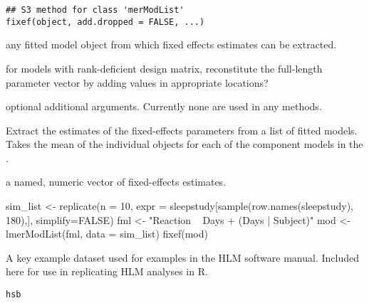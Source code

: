 \documentclass[letterpaper]{book}
\begin{document}
%
\begin{Usage}
\begin{verbatim}
## S3 method for class 'merModList'
fixef(object, add.dropped = FALSE, ...)
\end{verbatim}
\end{Usage}
%
\begin{Arguments}
\begin{ldescription}
\item[\code{object}] any fitted model object from which fixed
effects estimates can be extracted.

\item[\code{add.dropped}] for models with rank-deficient design
matrix, reconstitute the full-length parameter vector by
adding  values in appropriate locations?

\item[\code{...}] optional additional arguments. Currently
none are used in any methods.
\end{ldescription}
\end{Arguments}
%
\begin{Details}\relax
Extract the estimates of the fixed-effects parameters from a list of
fitted  models. Takes the mean of the individual 
objects for each of the component models in the .
\end{Details}
%
\begin{Value}
a named, numeric vector of fixed-effects estimates.
\end{Value}
%
\begin{Examples}
\begin{ExampleCode}
sim_list <- replicate(n = 10,
        expr = sleepstudy[sample(row.names(sleepstudy), 180),],
        simplify=FALSE)
fml <- "Reaction ~ Days + (Days | Subject)"
mod <- lmerModList(fml, data = sim_list)
fixef(mod)
\end{ExampleCode}
\end{Examples}
%
\begin{Description}\relax
A key example dataset used for examples in the HLM software manual.
Included here for use in replicating HLM analyses in R.
\end{Description}
%
\begin{Usage}
\begin{verbatim}
hsb
\end{verbatim}
\end{Usage}
\end{document}
